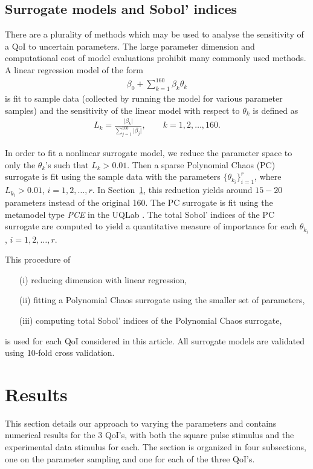 \documentclass[12pt]{article}
\numberwithin{equation}{section}
\begin{document}
\subsection{Surrogate models and Sobol' indices}
There are a plurality of methods which may be used to analyse the sensitivity of a QoI to uncertain parameters. The large parameter dimension and computational cost of model evaluations prohibit many commonly used methods. A linear regression model of the form
\begin{eqnarray*}
\beta_0 + \sum\limits_{k=1}^{160} \beta_k \theta_k
\end{eqnarray*}
is fit to sample data (collected by running the model for various parameter samples) and the sensitivity of the linear model with respect to $\theta_k$ is defined as
\begin{eqnarray*}
L_k = \frac{\vert \beta_k \vert}{\sum\limits_{j=1}^{160} \vert \beta_j \vert}, \qquad k=1,2,\dots,160.
\end{eqnarray*}

In order to fit a nonlinear surrogate model, we reduce the parameter space to only the $\theta_k$'s such that $L_k>0.01$. Then a sparse Polynomial Chaos (PC) surrogate is fit using the sample data with the parameters $\{\theta_{k_i}\}_{i=1}^r$, where $L_{k_i}>0.01$, $i=1,2,\dots,r$. In Section~\ref{sec:results}, this reduction yields around $15-20$ parameters instead of the original 160. The PC surrogate is fit using the metamodel type \textit{PCE} in the UQLab \cite{uqlab}. The total Sobol' indices \cite{saltellitotalindex} of the PC surrogate are computed to yield a quantitative measure of importance for each $\theta_{k_i}$, $i=1,2,\dots,r$.

This procedure of 
\begin{enumerate}
\item[(i)] reducing dimension with linear regression,
\item[(ii)] fitting a Polynomial Chaos surrogate using the smaller set of parameters,
\item[(iii)] computing total Sobol' indices of the Polynomial Chaos surrogate,
\end{enumerate}
is used for each QoI considered in this article. All surrogate models are validated using 10-fold cross validation.

\section{Results}
\label{sec:results}
This section details our approach to varying the parameters and contains numerical results for the 3 QoI's, with both the square pulse stimulus and the experimental data stimulus for each. The section is organized in four subsections, one on the parameter sampling and one for each of the three QoI's.
\end{document}
